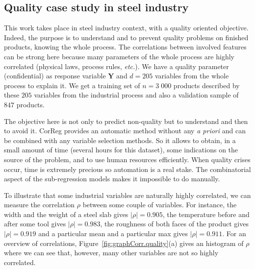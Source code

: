 \documentclass[11pt,a4paper]{article}
\begin{document}
\subsection{Quality case study in steel industry} \label{sectionexfos}
This work takes place in steel industry context, with a quality oriented objective. Indeed, the purpose is to understand and to prevent quality problems on finished products, knowing the whole process. The correlations between involved features can be strong here because many parameters of the whole process are highly correlated (physical laws, process rules, {\it etc.}). 
We have a quality parameter (confidential) as response variable $\boldsymbol{Y}$ and $d=205$ variables from the whole process to explain it. We get a training set of $n=3\;000$ products described by these $205$ variables from the industrial process and also a validation sample of $847$ products.

The objective here is not only to predict non-quality but to understand and then to avoid it. {\sc CorReg} provides an automatic method without any {\it a priori} and can be combined with any variable selection methods. So it allows to obtain, in a small amount of time (several hours for this dataset), some indications on the source of the problem, and to use human resources efficiently. When quality crises occur, time is extremely precious so automation is a real stake. The combinatorial aspect of the sub-regression models makes it impossible to do manually.

\vspace{3mm}

To illustrate that some industrial variables are naturally highly correlated, we can measure the correlation $\rho$ between some couple of variables. For instance, the width and the weight of a steel slab gives $|\rho|=0.905$, the temperature before and after some tool gives $|\rho|=0.983$, the  roughness of both faces of the product gives $|\rho|= 0.919$ and a particular mean and a particular max gives $|\rho|=0.911$. For an overview of correlations, Figure~\ref{fig:graphCorr.quality}(a) gives an histogram of $\rho$ where we can see that, however, many other variables are not so highly correlated.
\end{document}
